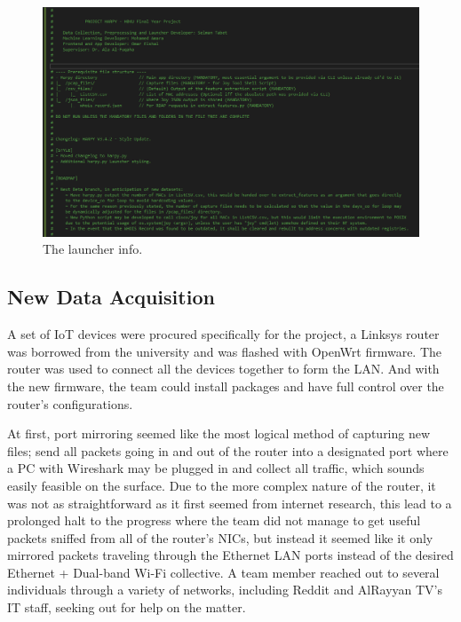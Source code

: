 \documentclass{article}
\begin{document}
\begin{figure}[!ht]
\begin{center}
\includegraphics[width=15cm]{InputSystem/NewLauncher.png}
\end{center}
\caption {The launcher info.}
\label{fig:newlauncher}
\end{figure}

\pagebreak

\subsection{New Data Acquisition}
A set of IoT devices were procured specifically for the project, a
Linksys router was borrowed from the university and was flashed with
OpenWrt firmware. The router was used to connect all the devices
together to form the LAN. And with the new firmware, the team could
install packages and have full control over the router's configurations.\newline

At first, port mirroring seemed like the most logical method of
capturing new files; send all packets going in and out of the router
into a designated port where a PC with Wireshark may be plugged in and
collect all traffic, which sounds easily feasible on the surface. Due to
the more complex nature of the router, it was not as straightforward as
it first seemed from internet research, this lead to a prolonged halt to
the progress where the team did not manage to get useful packets sniffed
from all of the router's NICs, but instead it seemed like it only
mirrored packets traveling through the Ethernet LAN ports instead of the
desired Ethernet + Dual-band Wi-Fi collective. A team member reached out
to several individuals through a variety of networks, including Reddit
and AlRayyan TV's IT staff, seeking out for help on the matter.\newline
\end{document}

